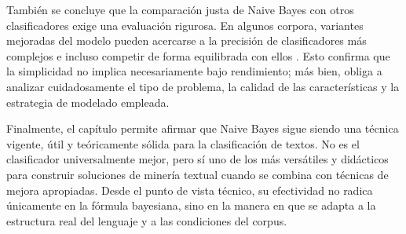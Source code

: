 También se concluye que la comparación justa de Naive Bayes con otros clasificadores exige una evaluación rigurosa. En algunos corpora, variantes mejoradas del modelo pueden acercarse a la precisión de clasificadores más complejos e incluso competir de forma equilibrada con ellos \cite{Kim2006,10.1145/2911451.2911547,KIM2018128}. Esto confirma que la simplicidad no implica necesariamente bajo rendimiento; más bien, obliga a analizar cuidadosamente el tipo de problema, la calidad de las características y la estrategia de modelado empleada.

Finalmente, el capítulo permite afirmar que Naive Bayes sigue siendo una técnica vigente, útil y teóricamente sólida para la clasificación de textos. No es el clasificador universalmente mejor, pero sí uno de los más versátiles y didácticos para construir soluciones de minería textual cuando se combina con técnicas de mejora apropiadas. Desde el punto de vista técnico, su efectividad no radica únicamente en la fórmula bayesiana, sino en la manera en que se adapta a la estructura real del lenguaje y a las condiciones del corpus.